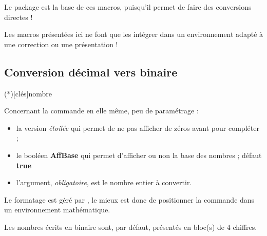 \documentclass[a4paper,french,11pt]{article}
\newcommand\ctex[1]{\tcbox[vignettelatex]{#1}}
\newcommand\Cle[1]{{\bfseries\sffamily\textlangle #1\textrangle}}
\begin{document}
\begin{codeinfo}
Le package \ctex{xintbinhex} est la base de ces macros, puisqu'il permet de faire des conversions directes !

\smallskip

Les macros présentées ici ne font que les intégrer dans un environnement adapté à une correction ou une présentation !
\end{codeinfo}

\begin{codetex}
\end{codetex}

\begin{codesortie}






\end{codesortie}

\subsection{Conversion décimal vers binaire}

\begin{codetex}
\ConversionDecBin(*)[clés]{nombre}
\end{codetex}

\begin{codecles}
Concernant la commande en elle même, peu de paramétrage :

\begin{itemize}
	\item la version \textit{étoilée} qui permet de ne pas afficher de zéros avant pour \og compléter \fg{} ;
	\item le booléen \Cle{AffBase} qui permet d'afficher ou non la base des nombres ; \hfill{}défaut \Cle{true}
	\item l'argument, \textit{obligatoire}, est le nombre entier à convertir.
\end{itemize}

Le formatage est géré par \ctex{sinuitx}, le mieux est donc de positionner la commande dans un environnement mathématique.

\smallskip

Les nombres écrits en binaire sont, par défaut, présentés en bloc(s) de 4 chiffres.
\end{codecles}
\end{document}
